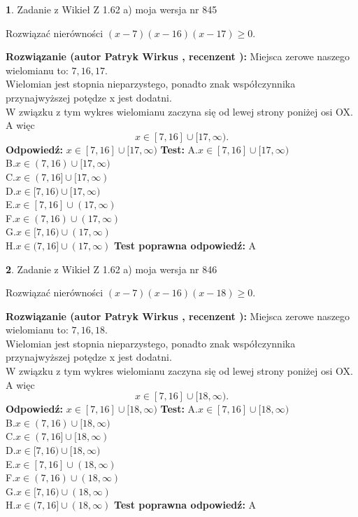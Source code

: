 \documentclass[12pt, a4paper]{article}
\theoremstyle{definition} %
\newtheorem{zad}{}
\newcommand{\zadStart}[1]{\begin{zad}#1\newline}
\newcommand{\zadStop}{\end{zad}}
\newcommand{\rozwStart}[2]{\noindent \textbf{Rozwiązanie (autor #1 , recenzent #2): }\newline}
\newcommand{\rozwStop}{\newline}
\newcommand{\odpStart}{\noindent \textbf{Odpowiedź:}\newline}
\newcommand{\odpStop}{\newline}
\newcommand{\testStart}{\noindent \textbf{Test:}\newline}
\newcommand{\testStop}{\newline}
\newcommand{\kluczStart}{\noindent \textbf{Test poprawna odpowiedź:}\newline}
\newcommand{\kluczStop}{\newline}
\begin{document}
\zadStart{Zadanie z Wikieł Z 1.62 a) moja wersja nr 845}

Rozwiązać nierówności $(x-7)(x-16)(x-17)\ge0$.
\zadStop
\rozwStart{Patryk Wirkus}{}
Miejsca zerowe naszego wielomianu to: $7, 16, 17$.\\
Wielomian jest stopnia nieparzystego, ponadto znak współczynnika przy\linebreak najwyższej potędze x jest dodatni.\\ W związku z tym wykres wielomianu zaczyna się od lewej strony poniżej osi OX. A więc $$x \in [7,16] \cup [17,\infty).$$
\rozwStop
\odpStart
$x \in [7,16] \cup [17,\infty)$
\odpStop
\testStart
A.$x \in [7,16] \cup [17,\infty)$\\
B.$x \in (7,16) \cup [17,\infty)$\\
C.$x \in (7,16] \cup [17,\infty)$\\
D.$x \in [7,16) \cup [17,\infty)$\\
E.$x \in [7,16] \cup (17,\infty)$\\
F.$x \in (7,16) \cup (17,\infty)$\\
G.$x \in [7,16) \cup (17,\infty)$\\
H.$x \in (7,16] \cup (17,\infty)$
\testStop
\kluczStart
A
\kluczStop



\zadStart{Zadanie z Wikieł Z 1.62 a) moja wersja nr 846}

Rozwiązać nierówności $(x-7)(x-16)(x-18)\ge0$.
\zadStop
\rozwStart{Patryk Wirkus}{}
Miejsca zerowe naszego wielomianu to: $7, 16, 18$.\\
Wielomian jest stopnia nieparzystego, ponadto znak współczynnika przy\linebreak najwyższej potędze x jest dodatni.\\ W związku z tym wykres wielomianu zaczyna się od lewej strony poniżej osi OX. A więc $$x \in [7,16] \cup [18,\infty).$$
\rozwStop
\odpStart
$x \in [7,16] \cup [18,\infty)$
\odpStop
\testStart
A.$x \in [7,16] \cup [18,\infty)$\\
B.$x \in (7,16) \cup [18,\infty)$\\
C.$x \in (7,16] \cup [18,\infty)$\\
D.$x \in [7,16) \cup [18,\infty)$\\
E.$x \in [7,16] \cup (18,\infty)$\\
F.$x \in (7,16) \cup (18,\infty)$\\
G.$x \in [7,16) \cup (18,\infty)$\\
H.$x \in (7,16] \cup (18,\infty)$
\testStop
\kluczStart
A
\kluczStop
\end{document}
